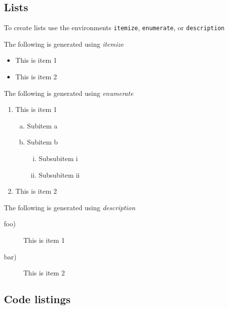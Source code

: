 \documentclass{UoNMCHA}
\numberwithin{equation}{section}
\begin{document}
\subsection{Lists}
To create lists use the environments \verb|itemize|, \verb|enumerate|, or \verb|description|

The following is generated using \emph{itemize}
\begin{itemize}
    \item This is item 1 
    \item This is item 2
\end{itemize}
%
The following is generated using \emph{enumerate}
\begin{enumerate}[1)]
    \item This is item 1 
    \begin{enumerate}[a)]
        \item Subitem a
        \item Subitem b
        \begin{enumerate}[i)]
            \item Subsubitem i
            \item Subsubitem ii
        \end{enumerate}
    \end{enumerate}
    \item This is item 2
\end{enumerate}
%
The following is generated using \emph{description}
\begin{description}
    \item[foo)] This is item 1 
    \item[bar)] This is item 2
\end{description}

\subsection{Code listings}
\end{document}
